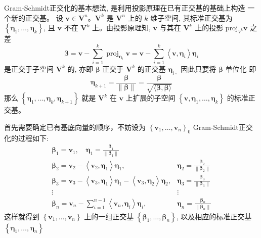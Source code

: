 \documentclass{ctexrep}
\begin{document}
Gram-Schmidt正交化的基本想法, 是利用投影原理在已有正交基的基础上构造 一个新的正交基。
设 $\boldsymbol{v} \in \boldsymbol{V}^{n} 。 \boldsymbol{V}^{k}$ 是 $\boldsymbol{V}^{n}$ 上的 $k$ 维子空间, 其标准正交基为 $\left\{\boldsymbol{\eta}_{1}, \ldots, \boldsymbol{\eta}_{k}\right\}$, 且 $\boldsymbol{v}$
不在 $\boldsymbol{V}^{k}$ 上。由投影原理知, $\boldsymbol{v}$ 与其在 $\boldsymbol{V}^{k}$ 上的投影 $\mathrm{proj}_{V^{k}} \boldsymbol{v}$ 之差
$$
\boldsymbol{\beta}=\boldsymbol{v}-\sum_{i=1}^{k} \operatorname{proj}_{\boldsymbol{\eta}_{i}} \boldsymbol{v}=\boldsymbol{v}-\sum_{i=1}^{k}\left\langle\boldsymbol{v}, \boldsymbol{\eta}_{i}\right\rangle \boldsymbol{\eta}_{i}
$$
是正交于子空间 $\boldsymbol{V}^{k}$ 的, 亦即 $\boldsymbol{\beta}$ 正交于 $\boldsymbol{V}^{k}$ 的正交基 $\boldsymbol{\eta}_{i \circ}$ 因此只要将 $\boldsymbol{\beta}$ 单位化
即
$$
\boldsymbol{\eta}_{k+1}=\frac{\boldsymbol{\beta}}{\|\boldsymbol{\beta}\|}=\frac{\boldsymbol{\beta}}{\sqrt{\langle\boldsymbol{\beta}, \boldsymbol{\beta}\rangle}}
$$
那么 $\left\{\boldsymbol{\eta}_{1}, \ldots, \boldsymbol{\eta}_{k}, \boldsymbol{\eta}_{k+1}\right\}$ 就是 $\boldsymbol{V}^{k}$ 在 $\boldsymbol{v}$ 上扩展的子空间 $\left\{\boldsymbol{v}, \boldsymbol{\eta}_{1}, \ldots, \boldsymbol{\eta}_{k}\right\}$ 的标准正交基。



首先需要确定已有基底向量的顺序，不妨设为 $\left\{\boldsymbol{v}_{1}, \ldots, \boldsymbol{v}_{n}\right\}_{0}$ Gram-Schmidt正交化的过程如下:
$$
\begin{array}{lc}
\boldsymbol{\beta}_{1}=\boldsymbol{v}_{1}, \quad \boldsymbol{\eta}_{1}=\frac{\boldsymbol{\beta}_{1}}{\left\|\boldsymbol{\beta}_{1}\right\|} \\
\boldsymbol{\beta}_{2}=\boldsymbol{v}_{2}-\left\langle\boldsymbol{v}_{2}, \boldsymbol{\eta}_{1}\right\rangle \boldsymbol{\eta}_{1}, & \boldsymbol{\eta}_{2}=\frac{\boldsymbol{\beta}_{2}}{\left\|\boldsymbol{\beta}_{2}\right\|} \\
\boldsymbol{\beta}_{3}=\boldsymbol{v}_{3}-\left\langle\boldsymbol{v}_{3}, \boldsymbol{\eta}_{1}\right\rangle \boldsymbol{\eta}_{1}-\left\langle\boldsymbol{v}_{3}, \boldsymbol{\eta}_{2}\right\rangle \boldsymbol{\eta}_{2}, & \boldsymbol{\eta}_{3}=\frac{\boldsymbol{\beta}_{3}}{\left\|\boldsymbol{\beta}_{3}\right\|} \\
\vdots & \vdots \\
\boldsymbol{\beta}_{n}=\boldsymbol{v}_{n}-\sum_{i=1}^{n-1}\left\langle\boldsymbol{v}_{n}, \boldsymbol{\eta}_{i}\right\rangle \boldsymbol{\eta}_{i}, & \boldsymbol{\eta}_{n}=\frac{\boldsymbol{\beta}_{n}}{\left\|\boldsymbol{\beta}_{n}\right\|}
\end{array}
$$
这样就得到 $\left\{\boldsymbol{v}_{1}, \ldots, \boldsymbol{v}_{n}\right\}$ 上的一组正交基 $\left\{\boldsymbol{\beta}_{1}, \ldots, \boldsymbol{\beta}_{n}\right\}$, 以及相应的标准正交基$\left\{\boldsymbol{\eta}_{1}, \ldots, \boldsymbol{\eta}_{n}\right\}$
\end{document}
